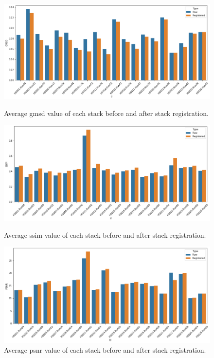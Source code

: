 \documentclass[12pt,oneside]{report}
\begin{document}
\begin{figure}
\centering
\begin{minipage}[h]{0.8\textwidth}
    \centering
    \includegraphics[width=\textwidth]{figures/stack-gmsd.png}
    \caption{Average \acrshort{gmsd} value of each stack before and after stack registration.}
    \label{fig:stack-gmsd}

    \includegraphics[width=\textwidth]{figures/stack-ssim.png}
    \caption{Average \acrshort{ssim} value of each stack before and after stack registration.}
    \label{fig:stack-ssim}

    \includegraphics[width=\textwidth]{figures/stack-psnr.png}
    \caption{Average \acrshort{psnr} value of each stack before and after stack registration.}
    \label{fig:stack-psnr}
\end{minipage}
\end{figure}
\end{document}
